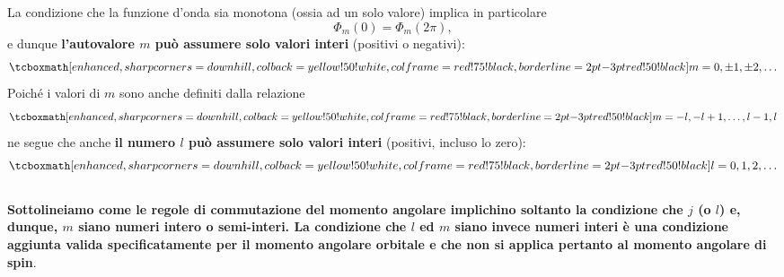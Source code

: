 La condizione che la funzione d'onda sia monotona (ossia ad un solo valore) implica in particolare
	\begin{equation}
		\Phi _m (0) =\Phi _m (2\pi ) ,
	\label{eq:cap17_10}
	\end{equation}
e dunque \textbf{l'autovalore $m$ può assumere solo valori interi} (positivi o negativi):
	\begin{equation}
		\tcboxmath[enhanced, sharp corners=downhill, colback=yellow!50!white, colframe=red!75!black, borderline={2pt}{-3pt}{red!50!black}]{
			m= 0, \pm 1,\pm 2, \dots
			}
	\end{equation}
Poiché i valori di $m$ sono anche definiti dalla relazione
	\begin{equation}
		\tcboxmath[enhanced, sharp corners=downhill, colback=yellow!50!white, colframe=red!75!black, borderline={2pt}{-3pt}{red!50!black}]{
			m = -l, -l+1,\dots, l-1,l
			}
	\end{equation}
ne segue che anche \textbf{il numero $l$ può assumere solo valori interi} (positivi, incluso lo zero):
	\begin{equation}
		\tcboxmath[enhanced, sharp corners=downhill, colback=yellow!50!white, colframe=red!75!black, borderline={2pt}{-3pt}{red!50!black}]{
			l= 0,1,2,\dots
			}
	\end{equation}\\
	
\textbf{Sottolineiamo come le regole di commutazione del momento angolare implichino soltanto la condizione che $j$ (o $l$) e, dunque, $m$  siano numeri intero o semi-interi. La condizione che $l$ ed $m$ siano invece numeri interi è una condizione aggiunta valida specificatamente per il momento angolare orbitale e che non si applica pertanto al momento angolare di spin}.\\

